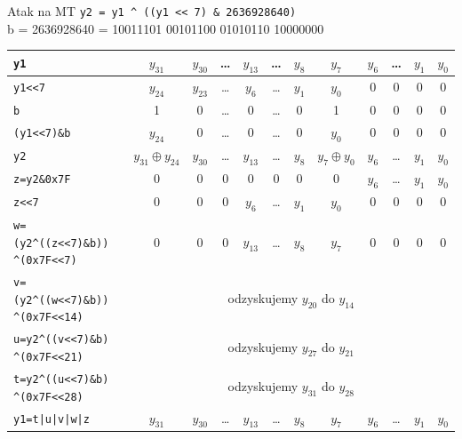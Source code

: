 \documentclass{mp}
\newcommand{\xor}{\oplus}
\begin{document}
\begin{frame}{Atak na MT}
\texttt{y2 = y1 \^{} ((y1 << 7) \& 2636928640)} \\
b = 2636928640 = 10011101 00101100 01010110 10000000 \\
\setlength\tabcolsep{3pt}
\small
\begin{tabular}{p{3cm}||c|c|c|c|c|c|c|c|c|c|c|}
\hline
\texttt{y1} & $y_{31}$ & $y_{30}$ & \ldots & $y_{13}$ & \ldots & $y_{8}$ & $y_{7}$ & $y_{6}$ & \ldots & $y_1$ & $y_0$ \pause\\
\hline
\texttt{y1<<7} & $y_{24}$ & $y_{23}$ & \ldots & $y_6$ & \ldots & $y_{1}$ & $y_{0}$ & 0 & 0 & 0 & 0 \pause\\
\hline
\texttt{b} & 1 & 0 & \ldots & 0 & \ldots & 0 & 1 & 0 & 0 & 0 & 0 \pause\\
\hline
\texttt{(y1<<7)\&b} & $y_{24}$ & 0 & \ldots & 0 & \ldots & 0 & $y_{0}$ & 0 & 0 & 0 & 0 \pause\\
\hline
\texttt{y2} & $y_{31}\xor y_{24}$ & $y_{30}$ & \ldots & $y_{13}$ & \ldots & $y_8$ & $y_7\xor y_{0}$ & $y_{6}$ & \ldots & $y_1$ & $y_0$ \pause\\
\hline
\hline
\texttt{z=y2\&0x7F} & 0 & 0 & 0 & 0 & 0 & 0 & 0 & $y_{6}$ & \ldots & $y_1$ & $y_0$ \pause\\
\hline
\texttt{z<<7} & 0 & 0 & 0 & $y_{6}$ & \ldots & $y_1$ & $y_0$ & 0 & 0 & 0 & 0 \pause\\
\hline
\texttt{w=(y2\^{}((z<<7)\&b))}
\texttt{\^{}(0x7F<<7)} & 0 & 0 & 0 & $y_{13}$ & \ldots & $y_8$ & $y_7$ & 0 & 0 & 0 & 0 \pause\\
\hline
\texttt{v=(y2\^{}((w<<7)\&b))} 
\texttt{\^{}(0x7F<<14)} & \multicolumn{11}{c|}{odzyskujemy $y_{20}$ do $y_{14}$\pause} \\
\hline
\texttt{u=y2\^{}((v<<7)\&b)}
\texttt{\^{}(0x7F<<21)} & \multicolumn{11}{c|}{odzyskujemy $y_{27}$ do $y_{21}$\pause} \\
\hline
\texttt{t=y2\^{}((u<<7)\&b)}
\texttt{\^{}(0x7F<<28)} & \multicolumn{11}{c|}{odzyskujemy $y_{31}$ do $y_{28}$\pause} \\
\hline
\texttt{y1=t|u|v|w|z} & $y_{31}$ & $y_{30}$ & \ldots & $y_{13}$ & \ldots & $y_{8}$ & $y_{7}$ & $y_{6}$ & \ldots & $y_1$ & $y_0$ \\
\hline
\end{tabular}
\end{frame}
\end{document}
